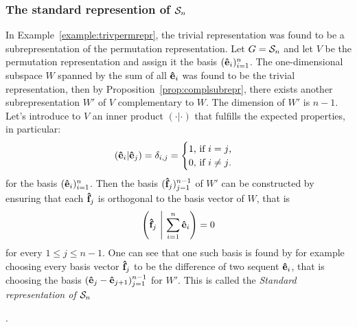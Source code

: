 {\allowdisplaybreaks\subsubsection{The standard represention of $\mathcal{S}_n$}
In Example~\ref{example:trivpermrepr}, the trivial representation was found to be a subrepresentation of the permutation representation. Let $G= \mathcal{S}_n$ and let $V$ be the permutation representation and assign it the basis $(\mathbf{\hat{e}}_i)_{i=1}^n$. The one-dimensional subspace $W$ spanned by the sum of all $\mathbf{\hat{e}}_i$ was found to be the trivial representation, then by Proposition~\ref{prop:complsubrepr}, there exists another subrepresentation $W'$ of $V$ complementary to $W$. The dimension of $W'$ is $n-1$. Let's introduce to $V$ an inner product $(\cdot|\cdot)$ that fulfills the expected properties, in particular:
\begin{align*}
	(\mathbf{\hat{e}}_i|\mathbf{\hat{e}}_j) = \delta_{i,j} = \begin{cases}
		1 \text{, if $i=j$,}\\
		0 \text{, if $i \neq j$.}
	\end{cases}
\end{align*}
for the basis $(\mathbf{\hat{e}}_i)_{i=1}^n$. Then the basis $(\mathbf{\hat{f}}_j)_{j=1}^{n-1}$ of $W'$ can be constructed by ensuring that each $\mathbf{\hat{f}}_j$ is orthogonal to the basis vector of $W$, that is
\begin{align*}
	\left( \mathbf{\hat{f}}_j \ \middle\vert \ \sum_{i=1}^n \mathbf{\hat{e}}_i \right) = 0
\end{align*}
for every $1 \leq j \leq n-1$. One can see that one such basis is found by for example choosing every basis vector $\mathbf{\hat{f}}_j$ to be the difference of two sequent $\mathbf{\hat{e}}_i$, that is choosing the basis $(\mathbf{\hat{e}}_j - \mathbf{\hat{e}}_{j+1})_{j=1}^{n-1}$ for $W'$. This is called the \emph{Standard representation of $\mathcal{S}_n$}~\cite[Sect.1.5.]{Sagan}}.

